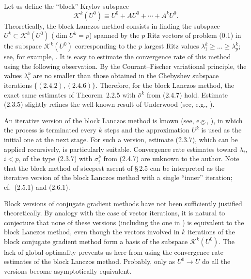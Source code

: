 \documentclass[11pt,oneside]{book}
\begin{document}
Let us define the ``block'' Krylov subspace
\[
\mathcal{K}^k(U^0) \equiv U^0 + A U^0 + \cdots + A^k U^0. \tag{2.6.1}
\]
Theoretically, the block Lanczos method consists in finding the subspace $U^k \subset \mathcal{K}^k(U^0)$ ($\dim U^k = p$) spanned by the $p$ Ritz vectors of problem (0.1) in the subspace $\mathcal{K}^k(U^0)$ corresponding to the $p$ largest Ritz values $\lambda_1^k \geqslant \ldots \geqslant \lambda_p^k$; see, for example, \citep{Parlett1983,Ikramov1982,GolubVanLoan1983,CullumWilloughby1985}. It is easy to estimate the convergence rate of this method using the following observation. By the Courant--Fischer variational principle, the values $\lambda_i^k$ are no smaller than those obtained in the Chebyshev subspace iterations $\{(2.4.2), (2.4.6)\}$. Therefore, for the block Lanczos method, the exact same estimates of Theorem~2.2.5 with $\bar{\sigma}^k$ from (2.4.7) hold. %
Estimate (2.3.5) slightly refines the well-known result of Underwood (see, e.g., \citep{Ikramov1982,GolubVanLoan1983}).

An iterative version of the block Lanczos method is known (see, e.g., \citep{CullumWilloughby1985}), in which the process is terminated every $k$ steps and the approximation $U^k$ is used as the initial one at the next stage. For such a version, estimate (2.3.7), which can be applied recursively, is particularly suitable. Convergence rate estimates toward $\lambda_i$, $i < p$, of the type (2.3.7) with $\bar{\sigma}_i^k$ from (2.4.7) are unknown to the author. Note that the block method of steepest ascent of \S\,2.5 can be interpreted as the iterative version of the block Lanczos method with a single ``inner'' iteration; cf.\ (2.5.1) and (2.6.1).

Block versions of conjugate gradient methods have not been sufficiently justified theoretically. By analogy with the case of vector iterations, it is natural to conjecture that none of these versions (including the one in \citep{CullumWilloughby1985}) is equivalent to the block Lanczos method, even though the vectors involved in $k$ iterations of the block conjugate gradient method form a basis of the subspace $\mathcal{K}^k(U^0)$. %
The lack of global optimality prevents us here
from using the convergence rate estimates of the block Lanczos method. Probably, only as $U^0 \to U$ do all the versions become asymptotically equivalent.
\end{document}
